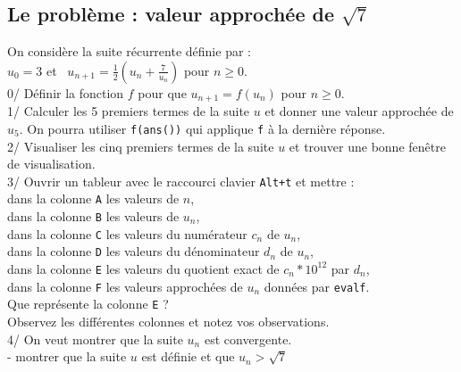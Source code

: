 \documentclass[a4paper,11pt]{book}
\begin{document}
\subsection{Le probl\`eme : valeur approch\'ee de $\sqrt 7$}
On consid\`ere la suite r\'ecurrente d\'efinie par :\\
$u_0=3$ et \ $\displaystyle u_{n+1}=\frac{1}{2}(u_n+\frac{7}{u_n})$ pour $n \geq 0$.\\
0/ D\'efinir la fonction $f$ pour que $u_{n+1}=f(u_n)$ pour $n \geq 0$.\\
1/ Calculer les 5 premiers termes de la suite $u$ et donner une valeur 
approch\'ee de $u_5$. On pourra utiliser {\tt f(ans())} qui applique {\tt f} 
\`a la derni\`ere r\'eponse.\\
2/ Visualiser les cinq premiers termes de la suite $u$ et trouver une bonne
 fen\^etre de visualisation.\\ 
3/ Ouvrir un tableur avec le raccourci clavier {\tt Alt+t} et mettre :\\
dans la colonne  {\tt A} les valeurs de $n$,\\
dans la colonne {\tt B} les valeurs de $u_n$,\\
dans la colonne {\tt C} les valeurs du num\'erateur $c_n$ de $u_n$,\\
dans la colonne  {\tt D} les valeurs du d\'enominateur $d_n$ de $u_n$,\\
dans la colonne  {\tt E} les valeurs du quotient exact de $c_n*10^{12}$ par 
$d_n$,\\
dans la colonne {\tt F} les valeurs approch\'ees de $u_n$ donn\'ees par 
{\tt evalf}.\\
Que repr\'esente la colonne {\tt E} ?\\
Observez les diff\'erentes colonnes et notez vos observations.\\
4/ On veut montrer que la suite  $u_n$ est convergente.\\ 
- montrer que la suite $u$ est d\'efinie et que  $u_n>\sqrt 7$ 
\end{document}

